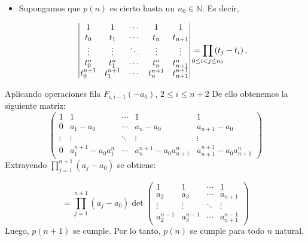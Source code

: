 \begin{frame}
\begin{solution}
\begin{itemize}
			\item

			      Supongamos que $p\left(n\right)$ es cierto hasta un
			      $n_{0}\in\mathbb{N}$. Es decir,

			      \begin{equation*}
				      \begin{vmatrix}
					      1           & 1           & \cdots & 1           & 1             \\
					      t_{0}       & t_{1}       & \cdots & t_{n}       & t_{n+1}       \\
					      \vdots      & \vdots      & \ddots & \vdots      & \vdots        \\
					      t_{0}^{n}   & t_{1}^{n}   & \cdots & t_{n}^{n}   & t_{n+1}^{n}   \\
					      t_{0}^{n+1} & t_{1}^{n+1} & \cdots & t_{n}^{n+1} & t_{n+1}^{n+1}
				      \end{vmatrix}=
				      \prod\limits_{\mathclap{0\leq i< j\leq n_{0}}}
				      \left(t_{j}-t_{i}\right).
			      \end{equation*}
		\end{itemize}
	\end{solution}
\end{frame}

\begin{frame}
	Aplicando operaciones fila $F_{i,i-1}(-a_{0})$, $2\leq i\leq n+2$
	De ello obtenemos la siguiente matriz:
	$$\begin{pmatrix} 1&1&\cdots & 1 &1\\   0&a_1-a_0&\cdots &a_n-a_0&a_{n+1}-a_0\\   \vdots&\vdots&\ddots&\vdots&\vdots\\   0&a_1^{n+1}-a_0a_{1}^{n}&\cdots&a_{n}^{n+1}-a_0a_{n+1}^{n}& a_{n+1}^{n+1}-a_0a_{n+1}^{n}\end{pmatrix}$$
	Extrayendo $\prod_{j=1}^{n+1}(a_j-a_0)$ se obtiene:

	$$=\prod_{j=1}^{n+1}(a_j-a_0) \det\begin{pmatrix} 1& 1&\cdots&1\\a_2&a_3&\cdots&a_{n+1}\\ \vdots&\vdots&\ddots&\vdots\\a_2^{n-1}&a_3^{n-1}&\cdots&a_{n+1}^{n-1}\end{pmatrix}$$
	Luego, $p\left(n+1\right)$ se cumple.
	Por lo tanto, $p\left(n\right)$ se cumple para todo $n$ natural.
\end{frame}